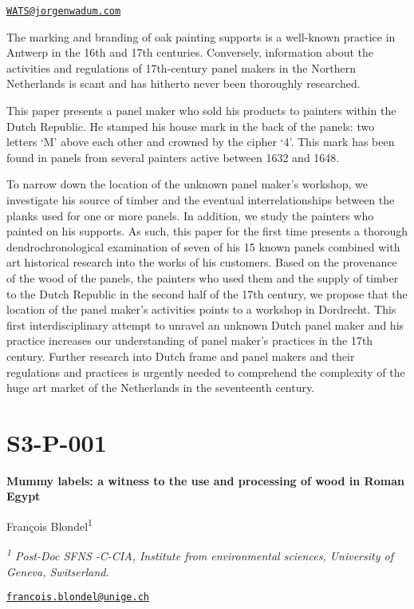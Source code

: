 \documentclass[
]{book}
\begin{document}
\href{mailto:WATS@jorgenwadum.com}{\nolinkurl{WATS@jorgenwadum.com}}

The marking and branding of oak painting supports is a well-known practice in Antwerp in the 16th and 17th centuries. Conversely, information about the activities and regulations of 17th-century panel makers in the Northern Netherlands is scant and has hitherto never been thoroughly researched.

This paper presents a panel maker who sold his products to painters within the Dutch Republic. He stamped his house mark in the back of the panels: two letters `M' above each other and crowned by the cipher `4'. This mark has been found in panels from several painters active between 1632 and 1648.

To narrow down the location of the unknown panel maker's workshop, we investigate his source of timber and the eventual interrelationships between the planks used for one or more panels. In addition, we study the painters who painted on his supports. As such, this paper for the first time presents a thorough dendrochronological examination of seven of his 15 known panels combined with art historical research into the works of his customers. Based on the provenance of the wood of the panels, the painters who used them and the supply of timber to the Dutch Republic in the second half of the 17th century, we propose that the location of the panel maker's activities points to a workshop in Dordrecht. This first interdisciplinary attempt to unravel an unknown Dutch panel maker and his practice increases our understanding of panel maker's practices in the 17th century. Further research into Dutch frame and panel makers and their regulations and practices is urgently needed to comprehend the complexity of the huge art market of the Netherlands in the seventeenth century.

\hypertarget{s3-p-001}{%
\section*{S3-P-001}\label{s3-p-001}}

\textbf{Mummy labels: a witness to the use and processing of wood in Roman Egypt}

François Blondel\textsuperscript{1}

\emph{\textsuperscript{1} Post-Doc SFNS -C-CIA, Institute from environmental sciences, University of Geneva, Switserland.}

\href{mailto:francois.blondel@unige.ch}{\nolinkurl{francois.blondel@unige.ch}}
\end{document}
